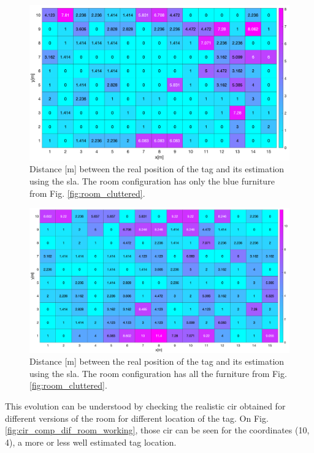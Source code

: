 \begin{figure}[H]
\centering
\includegraphics[width=.9\linewidth]{Images/cluttered_room.png}
\caption{Distance [m] between the real position of the tag and its estimation using the \gls{sla}. The room configuration has only the blue furniture from Fig. \ref{fig:room_cluttered}.
\label{fig:dist_clut_room}}
\end{figure}

\begin{figure}[H]
\centering
\includegraphics[width=.9\linewidth]{Images/sla_cluttered_lot.png}
\caption{Distance [m] between the real position of the tag and its estimation using the \gls{sla}. The room configuration has all the furniture from Fig. \ref{fig:room_cluttered}.\label{fig:dist_lot_clut_room}}
\end{figure}

This evolution can be understood by checking the realistic \gls{cir} obtained for different versions of the room for different location of the tag. On Fig. \ref{fig:cir_comp_dif_room_working}, those \gls{cir} can be seen for the coordinates (10, 4), a more or less well estimated tag location.

